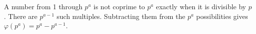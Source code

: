 A number from 1 through $p^a$ is not coprime to $p^a$ exactly when it is divisible by $p$. There are $p^{a-1}$ such multiples. Subtracting them from the $p^a$ possibilities gives $\boxed{\varphi(p^a)=p^a-p^{a-1}}$.
